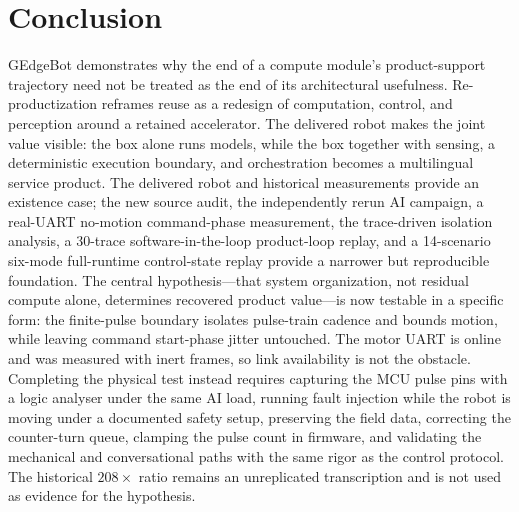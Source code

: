 \documentclass[conference]{IEEEtran}
\begin{document}
\section{Conclusion}
GEdgeBot demonstrates why the end of a compute module's product-support trajectory need not be treated as the end of its architectural usefulness. Re-productization reframes reuse as a redesign of computation, control, and perception around a retained accelerator. The delivered robot makes the joint value visible: the box alone runs models, while the box together with sensing, a deterministic execution boundary, and orchestration becomes a multilingual service product. The delivered robot and historical measurements provide an existence case; the new source audit, the independently rerun AI campaign, a real-UART no-motion command-phase measurement, the trace-driven isolation analysis, a 30-trace software-in-the-loop product-loop replay, and a 14-scenario six-mode full-runtime control-state replay provide a narrower but reproducible foundation. The central hypothesis---that system organization, not residual compute alone, determines recovered product value---is now testable in a specific form: the finite-pulse boundary isolates pulse-train cadence and bounds motion, while leaving command start-phase jitter untouched. The motor UART is online and was measured with inert frames, so link availability is not the obstacle. Completing the physical test instead requires capturing the MCU pulse pins with a logic analyser under the same AI load, running fault injection while the robot is moving under a documented safety setup, preserving the field data, correcting the counter-turn queue, clamping the pulse count in firmware, and validating the mechanical and conversational paths with the same rigor as the control protocol. The historical $208\times$ ratio remains an unreplicated transcription and is not used as evidence for the hypothesis.
\end{document}
